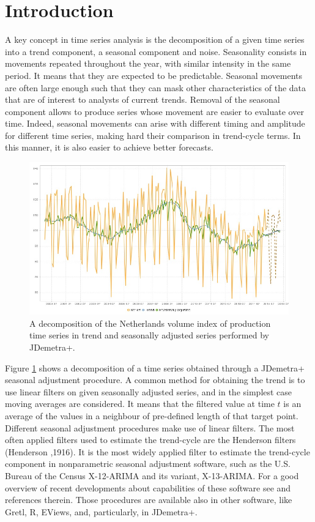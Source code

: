 \documentclass[english,blauw]{cbsdiscussionpaper}
\begin{document}
\section{Introduction}
A key concept in time series analysis is the decomposition of a given time series into a trend component, a seasonal component and noise. Seasonality consists in movements repeated throughout the year, with similar intensity in the same period. It means that they are expected to be predictable. Seasonal movements are often large enough such that they can mask other characteristics of the data that are of interest to analysts of current trends. Removal of the seasonal component allows to produce series whose movement are easier to evaluate over time. Indeed, seasonal movements can arise with different timing and amplitude for different time series, making hard their comparison in trend-cycle terms. In this manner, it is also easier to achieve better forecasts.
\begin{figure}[h]
\includegraphics[width=\linewidth]{../images/capitolo1/intro.jpg}
\caption{A decomposition of the Netherlands volume index of production time series in trend and seasonally adjusted series performed by JDemetra+.}
\label{fig:intro}
\end{figure}
Figure \ref{fig:intro} shows a decomposition of a time series obtained through a JDemetra+ seasonal adjustment procedure. A common method for obtaining the trend is to use linear filters on given seasonally adjusted series, and in the simplest case moving averages are considered. It means that the filtered value at time $t$ is an average of the values in a neighbour of pre-defined length of that target point. Different seasonal adjustment procedures make use of linear filters. The most often applied filters used to estimate the trend-cycle are the Henderson filters (Henderson ,1916). It is the most widely applied filter to estimate the trend-cycle component in nonparametric seasonal adjustment software, such as the U.S. Bureau of the Census X-12-ARIMA and its variant, X-13-ARIMA. For a good overview of recent developments about capabilities of these software see \citep{fin2005} and references therein. Those procedures are available also in other software, like Gretl, R, EViews, and, particularly, in JDemetra+.\\
\end{document}
